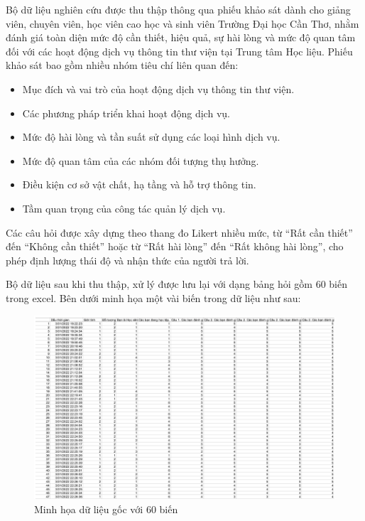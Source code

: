 Bộ dữ liệu nghiên cứu được thu thập thông qua phiếu khảo sát dành cho giảng viên, chuyên viên, học viên cao học và sinh viên Trường Đại học Cần Thơ, nhằm đánh giá toàn diện mức độ cần thiết, hiệu quả, sự hài lòng và mức độ quan tâm đối với các hoạt động dịch vụ thông tin thư viện tại Trung tâm Học liệu. Phiếu khảo sát bao gồm nhiều nhóm tiêu chí liên quan đến:
\begin{itemize}
    \item Mục đích và vai trò của hoạt động dịch vụ thông tin thư viện.
    \item Các phương pháp triển khai hoạt động dịch vụ.
    \item Mức độ hài lòng và tần suất sử dụng các loại hình dịch vụ.
    \item Mức độ quan tâm của các nhóm đối tượng thụ hưởng.
    \item Điều kiện cơ sở vật chất, hạ tầng và hỗ trợ thông tin.
    \item Tầm quan trọng của công tác quản lý dịch vụ.
\end{itemize}

Các câu hỏi được xây dựng theo thang đo Likert nhiều mức, từ ``Rất cần thiết'' đến ``Không cần thiết'' hoặc từ ``Rất hài lòng'' đến ``Rất không hài lòng'', cho phép định lượng thái độ và nhận thức của người trả lời.

Bộ dữ liệu sau khi thu thập, xử lý được lưu lại với dạng bảng hỏi gồm 60 biến trong excel. Bên dưới minh họa một vài biến trong dữ liệu như sau:
\begin{figure}[h!]
    \centering
    \includegraphics[width=\textwidth]{../../assets/images/SP19.png}
    \caption{Minh họa dữ liệu gốc với 60 biến}
    \label{fig:original_data}
\end{figure}

